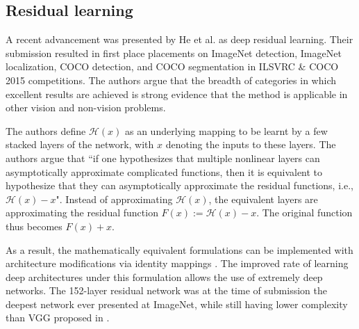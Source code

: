 \documentclass[12pt]{llncs}
\begin{document}




\subsection{Residual learning}
A recent advancement was presented by He et al. \cite{he2016deep} as deep residual learning. Their submission resulted in first place placements on ImageNet detection, ImageNet localization, COCO detection, and COCO segmentation in ILSVRC \&
COCO 2015 competitions. The authors argue that the breadth of categories in which excellent results are achieved is strong evidence that the method is applicable in other vision and non-vision problems. 

The authors define $\mathcal{H}(x)$ as an underlying mapping to be learnt by a few stacked layers of the network, with $x$ denoting the inputs to these layers. The authors argue that ``if one hypothesizes that multiple nonlinear layers can asymptotically approximate complicated functions, then it is equivalent to hypothesize that they can asymptotically approximate the residual functions, i.e., $\mathcal{H}(x) - x$". Instead of approximating $\mathcal{H}(x)$, the equivalent layers are approximating the residual function $F(x) := \mathcal{H}(x) - x$. The original function thus becomes $F(x)+x$. 

As a result, the mathematically equivalent formulations can be implemented with architecture modifications via identity mappings \cite[figx]{he2016deep}. The improved rate of learning deep architectures under this formulation allows the use of extremely deep networks. The 152-layer residual network was at the time of submission the deepest network ever presented at ImageNet, while still having lower complexity than VGG proposed in \cite{simonyan2014very}.
\end{document}
